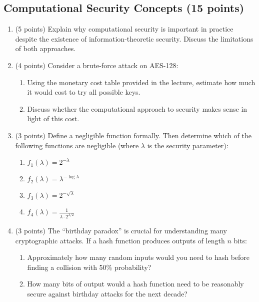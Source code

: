 \documentclass[10pt,a4paper,american]{article}
\begin{document}
\subsection{Computational Security Concepts (15 points)}

\begin{enumerate}
	\item (5 points) Explain why computational security is important in practice despite the existence of information-theoretic security. Discuss the limitations of both approaches.

	\item (4 points) Consider a brute-force attack on AES-128:
	      \begin{enumerate}
		      \item Using the monetary cost table provided in the lecture, estimate how much it would cost to try all possible keys.
		      \item Discuss whether the computational approach to security makes sense in light of this cost.
	      \end{enumerate}

	\item (3 points) Define a negligible function formally. Then determine which of the following functions are negligible (where $\lambda$ is the security parameter):
	      \begin{enumerate}
		      \item $f_1(\lambda) = 2^{-\lambda}$
		      \item $f_2(\lambda) = \lambda^{-\log \lambda}$
		      \item $f_3(\lambda) = 2^{-\sqrt{\lambda}}$
		      \item $f_4(\lambda) = \frac{1}{\lambda \cdot 2^{\lambda/2}}$
	      \end{enumerate}

	\item (3 points) The ``birthday paradox'' is crucial for understanding many cryptographic attacks. If a hash function produces outputs of length $n$ bits:
	      \begin{enumerate}
		      \item Approximately how many random inputs would you need to hash before finding a collision with 50\% probability?
		      \item How many bits of output would a hash function need to be reasonably secure against birthday attacks for the next decade?
	      \end{enumerate}
\end{enumerate}
\end{document}
